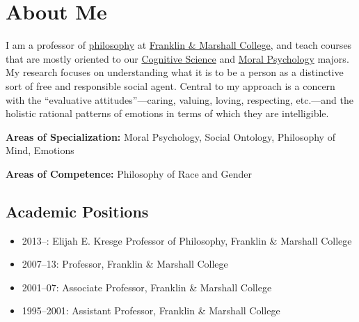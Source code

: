 \documentclass[%
  11pt,%
]{article}
\begin{document}

\tableofcontents

\ifdefined\HCode

    \begin{center}
    \end{center}
\fi

\section*{About Me}

I am a professor of \href{https://www.fandm.edu/fields-of-study/philosophy/index.html}{philosophy} at \href{https://www.fandm.edu}{Franklin \& Marshall College}, and teach courses that are mostly oriented to our \href{https://www.fandm.edu/fields-of-study/cognitive-science/index.html}{Cognitive Science} and \href{https://www.fandm.edu/fields-of-study/moral-psychology/index.html}{Moral Psychology} majors. My research focuses on understanding what it is to be a person as a distinctive sort of free and responsible social agent. Central to my approach is a concern with the \enquote{evaluative attitudes}---caring, valuing, loving, respecting, etc.---and the holistic rational patterns of emotions in terms of which they are intelligible.

\noindent\textbf{Areas of Specialization:} Moral Psychology, Social Ontology, Philosophy of Mind, Emotions

\noindent\textbf{Areas of Competence:} Philosophy of Race and Gender

\subsection*{Academic Positions}

\begin{itemize}
  \item 2013--: Elijah E. Kresge Professor of Philosophy, Franklin \& Marshall College
  \item 2007--13: Professor, Franklin \& Marshall College
  \item 2001--07: Associate Professor, Franklin \& Marshall College
  \item 1995--2001: Assistant Professor, Franklin \& Marshall College
\end{itemize}
\end{document}
